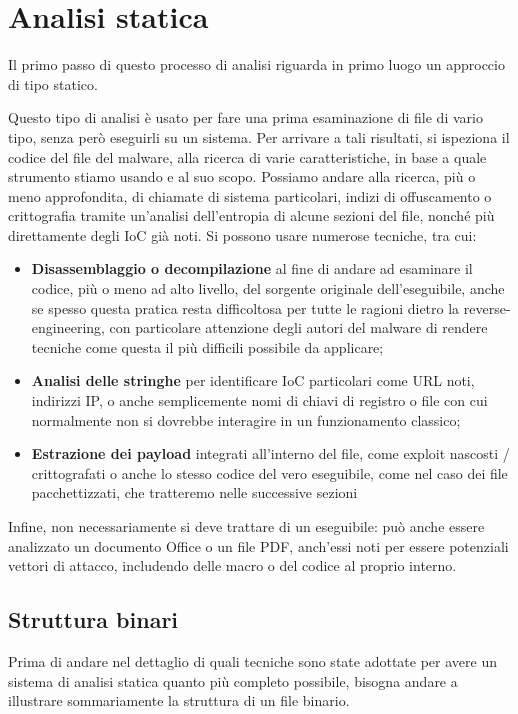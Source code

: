\chapter{Analisi statica}
Il primo passo di questo processo di analisi riguarda in primo luogo un approccio di tipo statico.

Questo tipo di analisi è usato per fare una prima esaminazione di file di vario tipo, senza però eseguirli su un sistema.
Per arrivare a tali risultati, si ispeziona il codice del file del malware, alla ricerca di varie caratteristiche, in base a quale strumento stiamo usando e al suo scopo.
Possiamo andare alla ricerca, più o meno approfondita, di chiamate di sistema particolari, indizi di offuscamento o crittografia tramite un'analisi dell'entropia di alcune sezioni del file, nonché più direttamente degli IoC già noti.
Si possono usare numerose tecniche, tra cui:

\begin{itemize}
    \item \textbf{Disassemblaggio o decompilazione} al fine di andare ad esaminare il codice, più o meno ad alto livello, del sorgente originale dell'eseguibile, anche se spesso questa pratica resta difficoltosa per tutte le ragioni dietro la reverse-engineering, con particolare attenzione degli autori del malware di rendere tecniche come questa il più difficili possibile da applicare;
    \item \textbf{Analisi delle stringhe} per identificare IoC particolari come URL noti, indirizzi IP, o anche semplicemente nomi di chiavi di registro o file con cui normalmente non si dovrebbe interagire in un funzionamento classico;
    \item \textbf{Estrazione dei payload} integrati all'interno del file, come exploit nascosti / crittografati o anche lo stesso codice del vero eseguibile, come nel caso dei file pacchettizzati, che tratteremo nelle successive sezioni
\end{itemize}

Infine, non necessariamente si deve trattare di un eseguibile: può anche essere analizzato un documento Office o un file PDF, anch'essi noti per essere potenziali vettori di attacco, includendo delle macro o del codice al proprio interno.

\section{Struttura binari}
\label{chap:static_analysis_binary_structure}
Prima di andare nel dettaglio di quali tecniche sono state adottate per avere un sistema di analisi statica quanto più completo possibile, bisogna andare a illustrare sommariamente la struttura di un file binario.

